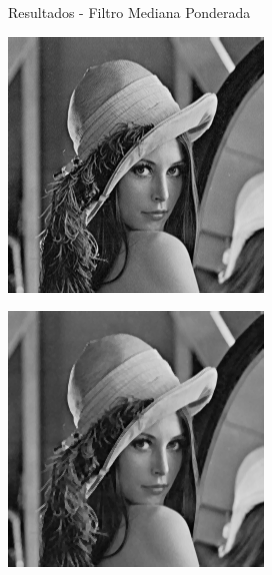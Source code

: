 \documentclass{beamer}
\begin{document}
\begin{frame}[fragile]{Resultados - Filtro Mediana Ponderada}
	\vspace{0.5cm}
	\centering
	\begin{minipage}{0.45\linewidth}
		\centering
		\includegraphics[width=\linewidth]{../results/lena_original}
		\label{fig:lenaoriginal10c}
	\end{minipage}\hfill
	\begin{minipage}{0.45\linewidth}
		\centering
		\includegraphics[width=\linewidth]{../results/lena_ej10c}
		\label{fig:lenaej10c}
	\end{minipage}
\end{frame}
\end{document}
